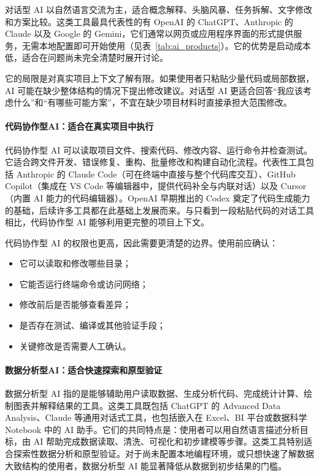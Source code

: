 对话型 AI 以自然语言交流为主，适合概念解释、头脑风暴、任务拆解、文字修改和方案比较。这类工具最具代表性的有 OpenAI 的 ChatGPT、Anthropic 的 Claude 以及 Google 的 Gemini，它们通常以网页或应用程序界面的形式提供服务，无需本地配置即可开始使用（见表~\ref{tab:ai_products}）。它的优势是启动成本低，适合在问题尚未完全清楚时展开讨论。


它的局限是对真实项目上下文了解有限。如果使用者只粘贴少量代码或局部数据，AI 可能在缺少整体结构的情况下提出修改建议。对话型 AI 更适合回答“我应该考虑什么”和“有哪些可能方案”，不宜在缺少项目材料时直接承担大范围修改。

\paragraph{代码协作型AI：适合在真实项目中执行}

代码协作型 AI 可以读取项目文件、搜索代码、修改内容、运行命令并检查测试。它适合跨文件开发、错误修复、重构、批量修改和构建自动化流程。代表性工具包括 Anthropic 的 Claude Code（可在终端中直接与整个代码库交互）、GitHub Copilot（集成在 VS Code 等编辑器中，提供代码补全与内联对话）以及 Cursor（内置 AI 能力的代码编辑器）。OpenAI 早期推出的 Codex 奠定了代码生成能力的基础，后续许多工具都在此基础上发展而来。与只看到一段粘贴代码的对话工具相比，代码协作型 AI 能够利用更完整的项目上下文。


代码协作型 AI 的权限也更高，因此需要更清楚的边界。使用前应确认：

\begin{itemize}
  \item 它可以读取和修改哪些目录；
  \item 它能否运行终端命令或访问网络；
  \item 修改前后是否能够查看差异；
  \item 是否存在测试、编译或其他验证手段；
  \item 关键修改是否需要人工确认。
\end{itemize}

\paragraph{数据分析型AI：适合快速探索和原型验证}

数据分析型 AI 指的是能够辅助用户读取数据、生成分析代码、完成统计计算、绘制图表并解释结果的工具。这类工具既包括 ChatGPT 的 Advanced Data Analysis、Claude 等通用对话式工具，也包括嵌入在 Excel、BI 平台或数据科学 Notebook 中的 AI 助手。它们的共同特点是：使用者可以用自然语言描述分析目标，由 AI 帮助完成数据读取、清洗、可视化和初步建模等步骤。这类工具特别适合探索性数据分析和原型验证。对于尚未配置本地编程环境，或只想快速了解数据大致结构的使用者，数据分析型 AI 能显著降低从数据到初步结果的门槛。

